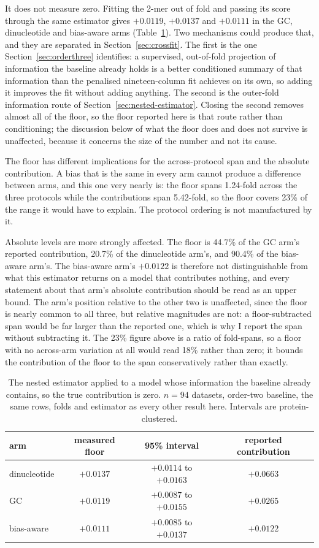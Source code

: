 It does not measure zero. Fitting the 2-mer out of fold and passing its score through the same
estimator gives $+0.0119$, $+0.0137$ and $+0.0111$ in the GC, dinucleotide and bias-aware arms
(Table~\ref{tab:floor}). Two mechanisms could produce that, and they are separated in
Section~\ref{sec:crossfit}. The first is the one Section~\ref{sec:orderthree} identifies: a
supervised, out-of-fold projection of information the baseline already holds is a better
conditioned summary of that information than the penalised nineteen-column fit achieves on its
own, so adding it improves the fit without adding anything. The second is the outer-fold
information route of Section~\ref{sec:nested-estimator}. Closing the second removes almost all of the
floor, so the floor reported here is that route rather than conditioning; the discussion below
of what the floor does and does not survive is unaffected, because it concerns the size of the
number and not its cause.

The floor has different implications for the across-protocol span and the absolute contribution.
A bias that is the same in every arm cannot produce a difference between
arms, and this one very nearly is: the floor spans 1.24-fold across the three protocols while
the contributions span 5.42-fold, so the floor covers 23\% of the range it would have to explain.
The protocol ordering is not manufactured by it.

Absolute levels are more strongly affected. The floor is 44.7\% of the GC
arm's reported contribution, 20.7\% of the dinucleotide arm's, and 90.4\% of the bias-aware
arm's. The bias-aware arm's $+0.0122$ is therefore not distinguishable from what this estimator
returns on a model that contributes nothing, and every statement about that arm's absolute
contribution should be read as an upper bound. The arm's position relative to the other two is
unaffected, since the floor is nearly common to all three, but relative magnitudes are not: a
floor-subtracted span would be far larger than the reported one, which is why I report the
span without subtracting it. The 23\% figure above is a ratio of fold-spans, so a floor with no
across-arm variation at all would read 18\% rather than zero; it bounds the contribution of the
floor to the span conservatively rather than exactly.

\begin{table}[htbp]
\centering
\caption{The nested estimator applied to a model whose information the baseline already
contains, so the true contribution is zero. $n=94$ datasets, order-two baseline, the same rows,
folds and estimator as every other result here. Intervals are protein-clustered.}
\label{tab:floor}
\begin{tabular}{lccc}
\toprule
arm & measured floor & 95\% interval & reported contribution \\
\midrule
dinucleotide & $+0.0137$ & $+0.0114$ to $+0.0163$ & $+0.0663$ \\
GC & $+0.0119$ & $+0.0087$ to $+0.0155$ & $+0.0265$ \\
bias-aware & $+0.0111$ & $+0.0085$ to $+0.0137$ & $+0.0122$ \\
\bottomrule
\end{tabular}
\end{table}

